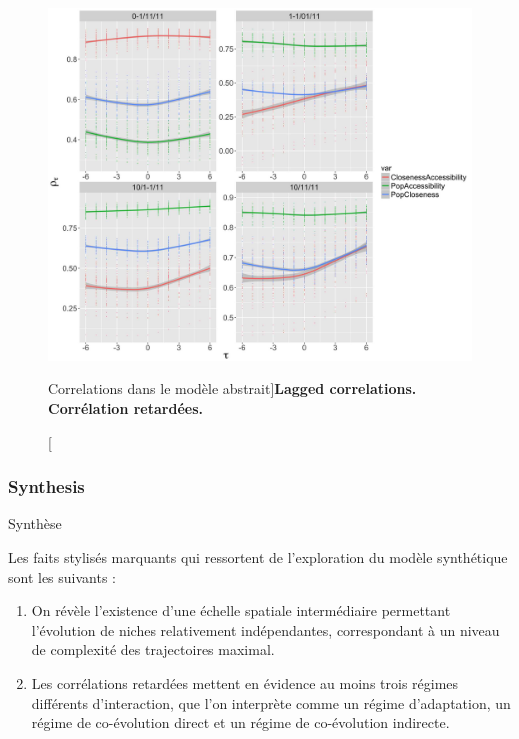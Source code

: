 \begin{figure}
	\includegraphics[width=\linewidth]{Figures/Final/6-2-2-fig-macrocoevol-correlations.jpg}
\caption[Correlations in the abstract model][Correlations dans le modèle abstrait]{\textbf{Lagged correlations.} \label{fig:macrocoevol:correlations}}{\textbf{Corrélation retardées.} \label{fig:macrocoevol:correlations}}
\end{figure}








\subsubsection{Synthesis}{Synthèse}

Les faits stylisés marquants qui ressortent de l'exploration du modèle synthétique sont les suivants :

\begin{enumerate}
	\item On révèle l'existence d'une échelle spatiale intermédiaire permettant l'évolution de niches relativement indépendantes, correspondant à un niveau de complexité des trajectoires maximal.
	\item Les corrélations retardées mettent en évidence au moins trois régimes différents d'interaction, que l'on interprète comme un régime d'adaptation, un régime de co-évolution direct et un régime de co-évolution indirecte.
\end{enumerate}

